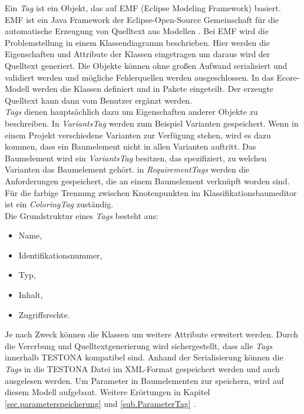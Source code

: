 Ein \textit{Tag} ist ein Objekt, das auf EMF (Eclipse Modeling Framework) basiert. EMF ist ein Java Framework der Eclipse-Open-Source Gemeinschaft für die automatische Erzeugung von Quelltext aus Modellen \cite{EclipseRCP}.  Bei EMF wird die Problemstellung in einem Klassendiagramm beschrieben. Hier werden die Eigenschaften und Attribute der Klassen eingetragen um daraus wird der Quelltext generiert. Die Objekte können ohne großen Aufwand serialisiert und validiert werden und mögliche Fehlerquellen werden ausgeschlossen. In das Ecore-Modell werden die Klassen definiert und in Pakete eingeteilt. Der erzeugte Quelltext kann dann vom Benutzer ergänzt werden.\\



\textit{Tags} dienen hauptsächlich dazu um Eigenschaften anderer Objekte zu beschreiben. In \textit{VariantsTag} werden zum Beispiel  Varianten gespeichert. Wenn in einem Projekt verschiedene Varianten zur Verfügung stehen, wird es dazu kommen, dass ein Baumelement nicht in allen Varianten auftritt. Das Baumelement wird ein \textit{VariantsTag} besitzen, das spezifiziert, zu welchen Varianten das Baumelement gehört. in \textit{RequirementTags} werden die Anforderungen gespeichert, die an einem Baumelement verknüpft worden sind. Für die farbige Trennung zwischen Knotenpunkten im Klassifikationsbaumeditor ist ein \textit{ColoringTag} zuständig.\\

Die Grundstruktur eines \textit{Tags} besteht aus:

\begin{itemize}
\item Name,
\item Identifikationsnummer,
\item Typ,
\item Inhalt,
\item Zugriffsrechte.
\end{itemize}


Je nach Zweck können die Klassen um weitere Attribute erweitert werden. Durch die Vererbung und Quelltextgenerierung wird sichergestellt, dass alle \textit{Tags} innerhalb TESTONA kompatibel sind. Anhand der Serialisierung können die \textit{Tags} in die TESTONA Datei im XML-Format gespeichert werden und auch ausgelesen werden. Um Parameter in Baumelementen zur speichern, wird auf diesem Modell aufgebaut. Weitere Erörtungen in Kapitel \ref{sec.parameterspeicherung} und \ref{sub.ParameterTag} .